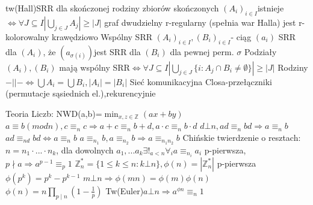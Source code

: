 \documentclass{article}
\begin{document}
{tw(Hall)SRR dla skończonej rodziny zbiorów skończonych $(A_i)_{i\in I}$istnieje $\Leftrightarrow\forall J\subseteq I |\bigcup_{j\in J}A_j|\ge|J|$\quad
graf dwudzielny r-regularny (spełnia war Halla) jest r-kolorowalny krawędziowo\newline
Wspólny SRR $(A_i)_{i\in I},(B_i)_{i\in I}$- ciąg $(a_i)$ SRR dla $(A_i)$, że $(a_{\sigma(i)})$jest SRR dla $(B_i)$ dla pewnej perm. $\sigma$\newline
Podziały $(A_i),(B_i)$ mają wspólny SRR$\Leftrightarrow\forall J\subseteq I |\bigcup_{j\in J}\{i:A_j\cap B_i\neq \emptyset\}|\ge |J|$\quad
Rodziny $-||-\Leftrightarrow\bigcup A_i=\bigcup B_i,|A_i|=|B_i|$\newline
Sieć komunikacyjna Closa-przełączniki (permutacje sąsiednich el.),rekurencyjnie\newline

Teoria Liczb:\newline
NWD(a,b)=$\min_{x,z\in\mathbb{Z}}(ax+by)$\quad
$a\equiv b (mod n),c\equiv_n c\Rightarrow a+c\equiv_n b+d,a\cdot c\equiv_n b\cdot d$\quad
$d\bot n,ad\equiv_n bd\Rightarrow a\equiv_n b$\quad
$ad\equiv_{nd}bd\Leftrightarrow a\equiv_n b$\quad
$a\equiv_{n_1}b,a\equiv_{n_2}b\Rightarrow a\equiv_{n_1n_2}b$\newline
Chińskie twierdzenie o resztach: $n=n_1\cdot...\cdot n_k$, dla dowolnych $a_1,...a_k\exists!_{a<n}\forall_i a\equiv_{n_i}a_i$\quad\quad
p-pierwsza,$p\nmid a\Rightarrow a^{p-1}\equiv_{p}1$\newline
$\mathbb{Z}^*_n=\{1\le k\le n:k\bot n\},\phi(n)=|\mathbb{Z}^*_n|$\quad
p-pierwsza $\phi(p^k)=p^k-p^{k-1}$\quad
$m\bot n\Rightarrow\phi(mn)=\phi(m)\phi(n)$\quad
$\phi(n)=n\prod_{p\mid n}(1-\frac{1}{p})$\newline
Tw(Euler)$a\bot n\Rightarrow a^{\phi{n}}\equiv_n 1$
\newline

}
\end{document}
